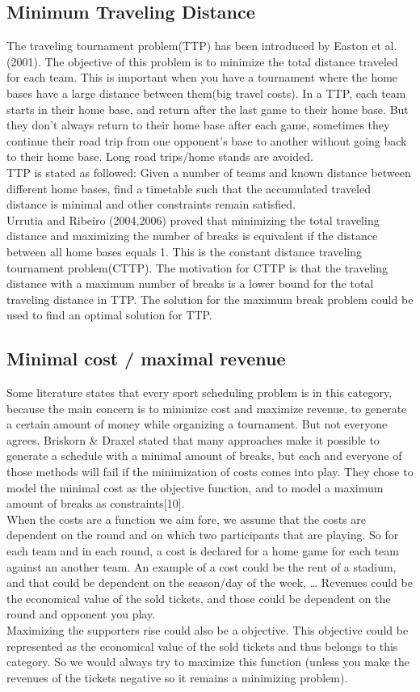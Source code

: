 \subsection{Minimum Traveling Distance}
The traveling tournament problem(TTP) has been introduced  by Easton et al. (2001). The objective of this problem is to minimize the total distance traveled for each team. This is important when you have a tournament where the home bases have a large distance between them(big travel costs). In a TTP, each team starts in their home base, and return after the last game to their home base. But they don’t always return to their home base after each game, sometimes they continue their road trip from one opponent’s base to another without going back to their home base. Long road trips/home stands are avoided.
\\[5px] 
TTP is stated as followed: Given a number of teams and known distance between different home bases, find a timetable such that the accumulated traveled distance is minimal and other constraints remain satisfied.    
\\[5px]
Urrutia and Ribeiro (2004,2006) proved that minimizing the total traveling distance and maximizing the number of breaks is equivalent if the distance between all home bases equals 1. This is the constant distance traveling tournament problem(CTTP). The motivation for CTTP is that the traveling distance with a maximum number of breaks is a lower bound for the total traveling distance in TTP. The solution for the maximum break problem could be used to find an optimal solution for TTP.

\subsection{Minimal cost  / maximal revenue}
Some literature states that every sport scheduling problem is in this category, because the main concern is to minimize cost and maximize revenue, to generate a certain amount of money while organizing a tournament. But not everyone agrees. Briskorn \& Draxel stated that many approaches  make it possible to generate a schedule with a minimal amount of breaks, but each and everyone of those methods  will fail if the minimization of costs comes into play. They chose to model the minimal cost as the objective function, and to model a maximum amount of breaks as constraints[10]. 
\\[5px]
When the costs are a function we aim fore, we assume that the costs are dependent on the round and on which two participants that are playing. So for each team and in each round, a cost is declared for a home game for each team against an another team. An example of a cost could be the rent of a stadium, and that could be dependent on the season/day of the week, … Revenues could be the economical value of the sold tickets, and those could be dependent on the round and opponent you play.
\\[5px]
Maximizing the supporters rise could also be a objective. This objective could be represented as the economical value of the sold tickets and thus belongs to this category. So we would always try to maximize this function (unless you make the revenues of the tickets negative so it remains a minimizing problem).

